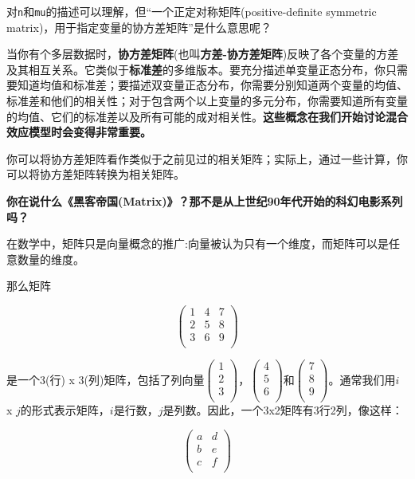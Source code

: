 \documentclass[
]{book}
\begin{document}
对\texttt{n}和\texttt{mu}的描述可以理解，但``一个正定对称矩阵(positive-definite symmetric matrix)，用于指定变量的协方差矩阵''是什么意思呢？

当你有个多层数据时，\textbf{协方差矩阵}(也叫\textbf{方差-协方差矩阵})反映了各个变量的方差及其相互关系。它类似于\textbf{标准差}的多维版本。要充分描述单变量正态分布，你只需要知道均值和标准差；要描述双变量正态分布，你需要分别知道两个变量的均值、标准差和他们的相关性；对于包含两个以上变量的多元分布，你需要知道所有变量的均值、它们的标准差以及所有可能的成对相关性。\textbf{这些概念在我们开始讨论混合效应模型时会变得非常重要。}

你可以将协方差矩阵看作类似于之前见过的相关矩阵；实际上，通过一些计算，你可以将协方差矩阵转换为相关矩阵。

\textbf{你在说什么《黑客帝国(Matrix)》？那不是从上世纪90年代开始的科幻电影系列吗？}

在数学中，矩阵只是向量概念的推广:向量被认为只有一个维度，而矩阵可以是任意数量的维度。

那么矩阵

\[
\begin{pmatrix}
1 & 4 & 7 \\
2 & 5 & 8 \\
3 & 6 & 9 \\
\end{pmatrix}
\]

是一个3(行) x 3(列)矩阵，包括了列向量\(\begin{pmatrix} 1 \\ 2 \\ 3 \\ \end{pmatrix}\)，\(\begin{pmatrix} 4 \\ 5 \\ 6 \\ \end{pmatrix}\)和\(\begin{pmatrix} 7 \\ 8 \\ 9 \\ \end{pmatrix}\)。通常我们用\(i\) x \(j\)的形式表示矩阵，\(i\)是行数，\(j\)是列数。因此，一个3x2矩阵有3行2列，像这样：

\[
\begin{pmatrix}
a & d \\
b & e \\
c & f \\
\end{pmatrix}
\]
\end{document}
